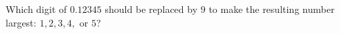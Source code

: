 Which digit of $0.12345$ should be replaced by $9$ to make the resulting number largest: $1,2,3,4,$ or $5$?
